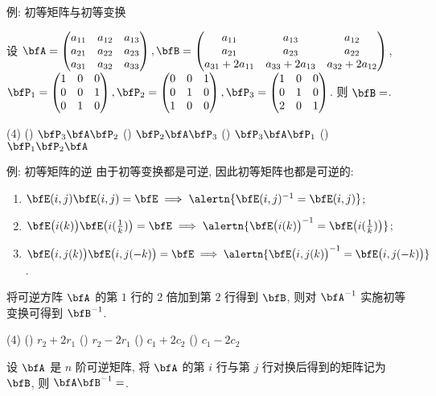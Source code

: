 \begin{frame}{例: 初等矩阵与初等变换}
	\onslide<+->
	\begin{exercise}
		设 $\bfA=\begin{pmatrix}
			a_{11}&a_{12}&a_{13}\\
			a_{21}&a_{22}&a_{23}\\
			a_{31}&a_{32}&a_{33}
		\end{pmatrix},\bfB=\begin{pmatrix}
			a_{11}&a_{13}&a_{12}\\
			a_{21}&a_{23}&a_{22}\\
			a_{31}+2a_{11}&a_{33}+2a_{13}&a_{32}+2a_{12}
		\end{pmatrix}$,\\
		$\bfP_1=\begin{pmatrix}
			1&0&0\\0&0&1\\0&1&0
		\end{pmatrix},\bfP_2=\begin{pmatrix}
			0&0&1\\0&1&0\\1&0&0
		\end{pmatrix},\bfP_3=\begin{pmatrix}
			1&0&0\\0&1&0\\2&0&1
		\end{pmatrix}$.
		则 $\bfB=$.
		\begin{exchoice}(4)
			() $\bfP_3\bfA\bfP_2$
			() $\bfP_2\bfA\bfP_3$
			() $\bfP_3\bfA\bfP_1$
			() $\bfP_1\bfP_2\bfA$
		\end{exchoice}
	\end{exercise}
\end{frame}


\begin{frame}{例: 初等矩阵的逆}
	\onslide<+->
	由于初等变换都是可逆, 因此初等矩阵也都是可逆的:
	\begin{enumerate}
		\item $\bfE(i,j)\bfE(i,j)=\bfE\implies \alertn{\bfE(i,j)^{-1}=\bfE(i,j)}$;
		\item $\bfE\bigl(i(k)\bigr)\bfE\bigl(i(\frac1k)\bigr)=\bfE\implies\alertn{\bfE\bigl(i(k)\bigr)^{-1}=\bfE\bigl(i(\frac1k)\bigr)}$;
		\item $\bfE\bigl(i,j(k)\bigr)\bfE\bigl(i,j(-k)\bigr)=\bfE\implies\alertn{\bfE\bigl(i,j(k)\bigr)^{-1}=\bfE\bigl(i,j(-k)\bigr)}$.
	\end{enumerate}
	\onslide<+->
	\begin{example}
		将可逆方阵 $\bfA$ 的第 $1$ 行的 $2$ 倍加到第 $2$ 行得到 $\bfB$, 则对 $\bfA^{-1}$ 实施初等变换可得到 $\bfB^{-1}$.
		\begin{exchoice}(4)
			() $r_2+2r_1$
			() $r_2-2r_1$
			() $c_1+2c_2$
			() $c_1-2c_2$
		\end{exchoice}
	\end{example}
	\onslide<+->
	\begin{exercise}
		设 $\bfA$ 是 $n$ 阶可逆矩阵, 将 $\bfA$ 的第 $i$ 行与第 $j$ 行对换后得到的矩阵记为 $\bfB$, 则 $\bfA\bfB^{-1}=$\fillblankframe[3cm]{$\bfE(i,j)$}.
	\end{exercise}
\end{frame}


